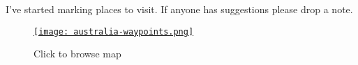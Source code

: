 I've started marking places to visit. If anyone has suggestions please
drop a note.



\captionsetup[figure]{labelformat=empty}
\begin{figure}[htbp]
\centering
\href{https://maps.google.com/maps/ms?msa=0&msid=213851645709730088342.0004d53e918c9e4567ff9&hl=en&ie=UTF8&t=m&ll=-24.926295,134.121094&spn=33.104736,45.615234&z=4&source=embed}{\texttt{[image: australia-waypoints.png]}}
\caption{Click to browse map}
\label{fig:3782X0}
\end{figure}


%